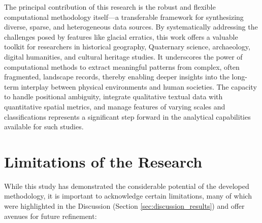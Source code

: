 \documentclass[
11pt, %
english, %
singlespacing, %
headsepline, %
]{MastersDoctoralThesis} %
\begin{document}
The principal contribution of this research is the robust and flexible computational methodology itself—a transferable framework for synthesizing diverse, sparse, and heterogeneous data sources. By systematically addressing the challenges posed by features like glacial erratics, this work offers a valuable toolkit for researchers in historical geography, Quaternary science, archaeology, digital humanities, and cultural heritage studies. It underscores the power of computational methods to extract meaningful patterns from complex, often fragmented, landscape records, thereby enabling deeper insights into the long-term interplay between physical environments and human societies. The capacity to handle positional ambiguity, integrate qualitative textual data with quantitative spatial metrics, and manage features of varying scales and classifications represents a significant step forward in the analytical capabilities available for such studies.

\section{Limitations of the Research}
\label{sec:limitations}

While this study has demonstrated the considerable potential of the developed \\methodology, it is important to acknowledge certain limitations, many of which were highlighted in the Discussion (Section \ref{sec:discussion_results}) and offer avenues for future refinement:
\end{document}
